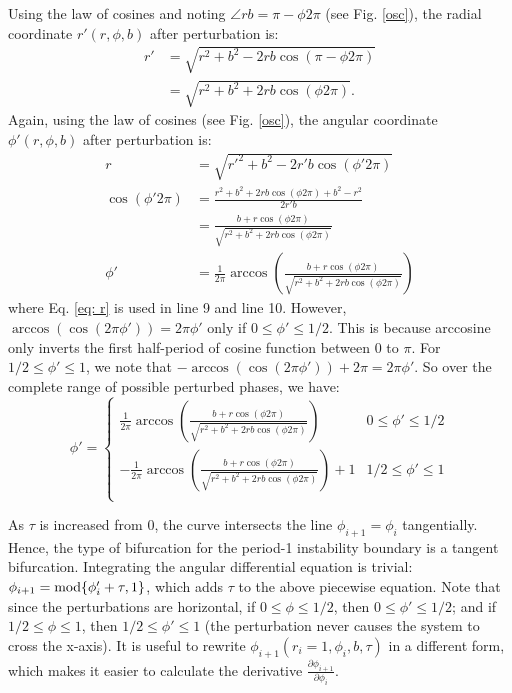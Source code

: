 Using the law of cosines and noting $\angle{rb}= \pi-\phi 2\pi$ (see Fig. \ref{osc}), the radial coordinate $r'(r,\phi,b)$ after perturbation is:
\begin{align}
    r'&=\sqrt{r^2+b^2-2rb\cos(\pi-\phi 2\pi)}\\
     &=\sqrt{r^2+b^2+2rb\cos(\phi 2\pi)} 
     \label{eq: r}.
\end{align}
Again, using the law of cosines (see Fig. \ref{osc}), the angular coordinate $\phi'(r,\phi,b)$ after perturbation is:
\begin{align}
    r &=\sqrt{r'^2+b^2-2r'b\cos(\phi' 2\pi)} \\
    \cos(\phi' 2\pi) &= \frac{r^2+b^2+2rb\cos(\phi 2\pi) +b^2 - r^2}{2r'b} \\
    &= \frac{b+r \cos(\phi 2\pi)}{\sqrt{r^2+b^2+2rb\cos(\phi 2\pi)}} \\
    \phi' &= \frac{1}{2\pi}\arccos(\frac{b+r \cos(\phi 2\pi)}{\sqrt{r^2+b^2+2rb\cos(\phi 2\pi)}})
\end{align} where Eq. \ref{eq: r} is used in line 9 and line 10. However, $\arccos(\cos(2\pi \phi')) = 2\pi \phi'$ only if $0\leq \phi' \leq 1/2$. This is because arccosine only inverts the first half-period of cosine function between $0$ to $\pi$. For $1/2 \leq \phi' \leq 1$, we note that $-\arccos(\cos(2\pi \phi')) +2\pi= 2\pi \phi'$. So over the complete range of possible perturbed phases, we have:
\begin{equation}
    \phi' =
    \begin{cases}
     \frac{1}{2\pi}\arccos(\frac{b+r \cos(\phi 2\pi)}{\sqrt{r^2+b^2+2rb\cos(\phi 2\pi)}}) & 0 \leq \phi' \leq 1/2 \\
    -\frac{1}{2\pi}\arccos(\frac{b+r \cos(\phi 2\pi)}{\sqrt{r^2+b^2+2rb\cos(\phi 2\pi)}}) + 1 & 1/2 \leq \phi' \leq 1 \\
    \end{cases}
\end{equation}

As $\tau$ is increased from 0, the curve intersects the line $\phi_{i+1}= \phi_i$ tangentially. Hence, the type of bifurcation for the period-1 instability boundary is a tangent bifurcation. Integrating the angular differential equation is trivial: $\phi_{i+1} = \textnormal{mod} \{\phi'_i + \tau,1\}$, which adds $\tau$ to the above piecewise equation. Note that since the perturbations are horizontal, if $0 \leq \phi \leq 1/2$, then $0 \leq \phi' \leq 1/2$; and if $1/2 \leq \phi \leq 1$, then $1/2 \leq \phi' \leq 1$ (the perturbation never causes the system to cross the x-axis). It is useful to rewrite $\phi_{i+1}(r_i=1,\phi_i,b,\tau)$ in a different form, which makes it easier to calculate the derivative $\frac{\partial \phi_{i+1}}{\partial \phi_i}$.

